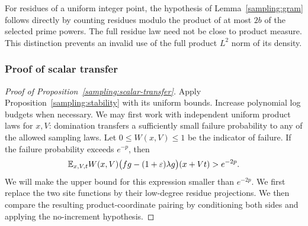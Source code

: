 For residues of a uniform integer point, the hypothesis of
Lemma~\ref{sampling:gram} follows directly by counting residues modulo the
product of at most $2b$ of the selected prime powers.  The full residue law
need not be close to product measure.  This distinction prevents an invalid
use of the full product $L^2$ norm of its density.

\subsubsection{Proof of scalar transfer}\label{sampling:scalar-proof}
\begin{proof}[Proof of Proposition~\ref{sampling:scalar-transfer}]
Apply Proposition~\ref{sampling:stability} with its uniform bounds.
Increase polynomial log budgets
when necessary.  We may first work with independent uniform product laws
for $x,V$: domination transfers a sufficiently small failure probability
to any of the allowed sampling laws.  Let $0\le W(x,V)\le1$ be the indicator
of failure.  If the failure probability exceeds $e^{-p}$, then
\begin{equation}\label{sampling:failure-pairing}
 \mathbb E_{x,V,t}W(x,V)
 \bigl(fg-(1+\varepsilon)\lambda g\bigr)(x+Vt)>e^{-2p}.
\end{equation}
We will make the upper bound for this expression smaller than $e^{-2p}$.
We first replace the two site functions by their low-degree residue
projections. We then compare the resulting product-coordinate pairing
by conditioning both sides and applying the no-increment hypothesis.


\end{proof}
